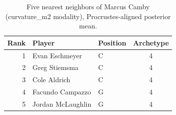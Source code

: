 \begin{table}[htbp]
  \centering\small
  \begin{tabular}{rllc}
    \toprule
    Rank & Player & Position & Archetype \\
    \midrule
    1 & Evan Eschmeyer & C & 4 \\
    2 & Greg Stiemsma & C & 4 \\
    3 & Cole Aldrich & C & 4 \\
    4 & Facundo Campazzo & G & 4 \\
    5 & Jordan McLaughlin & G & 4 \\
    \bottomrule
  \end{tabular}
  \caption{Five nearest neighbors of Marcus Camby (curvature_m2 modality), Procrustes-aligned posterior mean.}
  \label{tab:Marcus_Camby_neighbors_curvature_m2}
\end{table}

